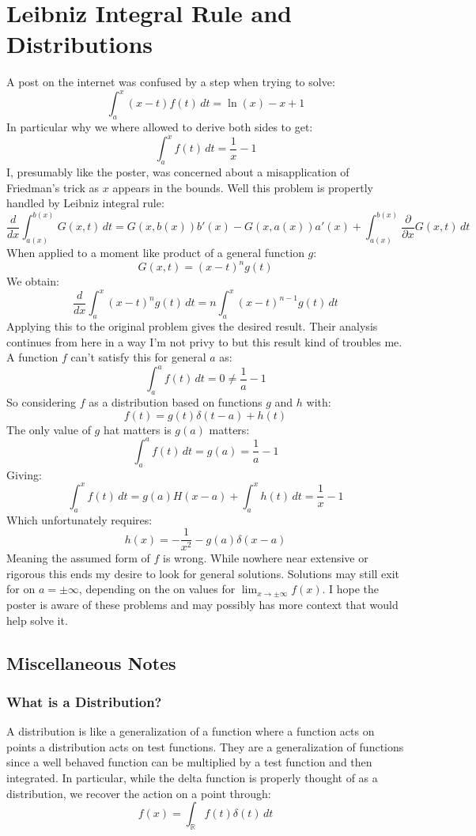 
\section{Leibniz Integral Rule and Distributions}
A post on the internet was confused by a step when trying to solve:
\[\int_a^x(x-t)f(t)\,dt = \ln(x)-x+1\]
In particular why we where allowed to derive both sides to get:
\[\int_a^xf(t)\,dt = \frac{1}{x}-1\]
I, presumably like the poster, was concerned about a misapplication of Friedman's trick as $x$ appears in the bounds.
Well this problem is propertly handled by Leibniz integral rule:
\[\frac{d}{d x}\int_{a(x)}^{b(x)}G(x,t)\,dt=G(x,b(x))b'(x)-G(x,a(x))a'(x)+\int_{a(x)}^{b(x)}\frac{\partial}{\partial x}G(x,t)\,dt\]
When applied to a moment like product of a general function $g$:
\[G(x,t)=(x-t)^ng(t)\]
We obtain:
\[\frac{d}{dx}\int_a^x(x-t)^ng(t)\,dt = n\int_a^x(x-t)^{n-1}g(t)\,dt\]
Applying this to the original problem gives the desired result.
Their analysis continues from here in a way I'm not privy to but this result kind of troubles me.
A function $f$ can't satisfy this for general $a$ as:
\[\int_a^af(t)\,dt = 0 \neq \frac{1}{a}-1\]
So considering $f$ as a distribution based on functions $g$ and $h$ with:
\[f(t) = g(t)\delta(t-a)+h(t)\]
The only value of $g$ hat matters is $g(a)$ matters:
\[\int_a^af(t)\,dt = g(a) = \frac{1}{a}-1\]
Giving:
\[\int_a^xf(t)\,dt = g(a)H(x-a) + \int_a^xh(t)\,dt = \frac{1}{x}-1\]
Which unfortunately requires:
\[h(x) = -\frac{1}{x^2}-g(a)\delta(x-a)\]
Meaning the assumed form of $f$ is wrong.
While nowhere near extensive or rigorous this ends my desire to look for general solutions.
Solutions may still exit for on $a=\pm\infty$,
depending on the on values for $\lim_{x\rightarrow\pm\infty}f(x)$.
I hope the poster is aware of these problems and may possibly has more context that would help solve it.

\subsection{Miscellaneous Notes}
\subsubsection{What is a Distribution?}
A distribution is like a generalization of a function where a function acts on points a distribution acts on test functions.
They are a generalization of functions since a well behaved function can be multiplied by a test function and then integrated.
In particular,
while the delta function is properly thought of as a distribution,
we recover the action on a point through:
\[f(x) = \int_\mathbb{R}f(t)\delta(t)\,dt\]

